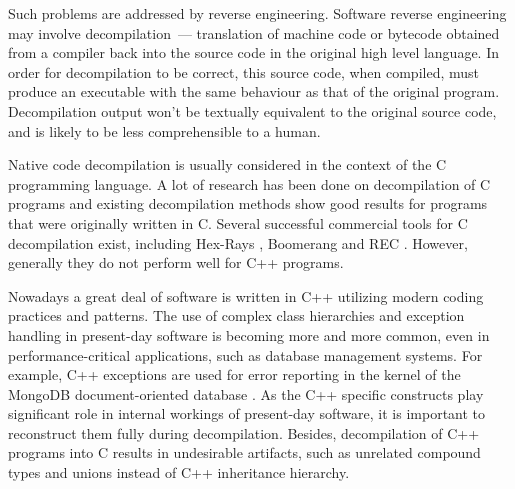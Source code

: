 \documentclass[10pt, conference, compsocconf]{IEEEtran}
\begin{document}

Such problems are addressed by reverse engineering. 
Software reverse engineering may involve decompilation~--- 
translation of machine code or bytecode obtained from a compiler 
back into the source code in the original high level language. 
In order for decompilation to be correct, this source code, when compiled, 
must produce an executable with the same behaviour as that of the 
original program. 
Decompilation output won't be textually equivalent to the original 
source code, and is likely to be less comprehensible to a human. 

Native code decompilation is usually considered in the context of
the C programming language. 
A lot of research has been done on decompilation of C programs and 
existing decompilation methods show good results for programs that 
were originally written in C. 
Several successful commercial tools for C decompilation exist, 
including Hex-Rays \cite{hexrays}, Boomerang \cite{boomerang} and REC \cite{rec}. 
However, generally they do not perform well for C++ programs. 

Nowadays a great deal of software is written in C++ utilizing modern 
coding practices and patterns.
The use of complex class hierarchies and exception handling in present-day software
is becoming more and more common, even in performance-critical applications,
such as database management systems. 
For example, C++ exceptions are used for error reporting in the kernel of the 
MongoDB document-oriented database \cite{mongodb}.
As the C++ specific constructs play significant role in internal 
workings of present-day software, it is important to reconstruct them fully
during decompilation.
Besides, decompilation of C++ programs into C results in undesirable 
artifacts, such as 
unrelated compound types and unions instead of C++ inheritance hierarchy.
\end{document}
